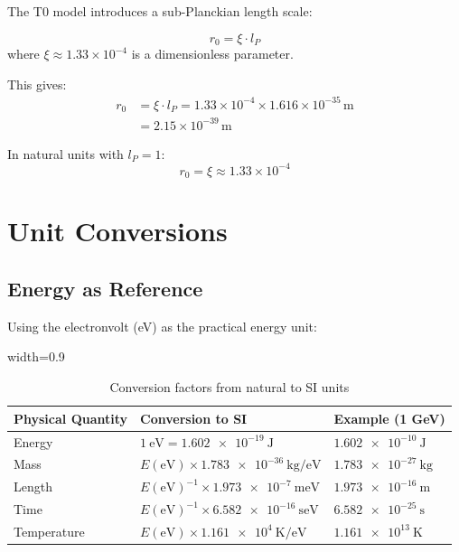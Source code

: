	The T0 model introduces a sub-Planckian length scale:
	
	\begin{definition}[T0 Length]
		\begin{equation}
			r_0 = \xi \cdot l_P
		\end{equation}
		where $\xi \approx 1.33 \times 10^{-4}$ is a dimensionless parameter.
	\end{definition}
	
	This gives:
	\begin{align}
		r_0 &= \xi \cdot l_P = 1.33 \times 10^{-4} \times 1.616 \times 10^{-35}\,\text{m} \\
		&= 2.15 \times 10^{-39}\,\text{m}
	\end{align}
	
	In natural units with $l_P = 1$:
	\begin{equation}
		r_0 = \xi \approx 1.33 \times 10^{-4}
	\end{equation}
	
	\section{Unit Conversions}
	
	\subsection{Energy as Reference}
	
	Using the electronvolt (eV) as the practical energy unit:
	
	\begin{table}[htbp]
		\centering
		\begin{adjustbox}{width=0.9\textwidth}
			\begin{tabular}{lll}
				\toprule
				\textbf{Physical Quantity} & \textbf{Conversion to SI} & \textbf{Example (1 GeV)} \\
				\midrule
				Energy & $\SI{1}{\electronvolt} = \SI{1.602e-19}{\joule}$ & $\SI{1.602e-10}{\joule}$ \\
				Mass & $E(\text{eV}) \times \SI{1.783e-36}{\kilogram\per\electronvolt}$ & $\SI{1.783e-27}{\kilogram}$ \\
				Length & $E(\text{eV})^{-1} \times \SI{1.973e-7}{\meter\electronvolt}$ & $\SI{1.973e-16}{\meter}$ \\
				Time & $E(\text{eV})^{-1} \times \SI{6.582e-16}{\second\electronvolt}$ & $\SI{6.582e-25}{\second}$ \\
				Temperature & $E(\text{eV}) \times \SI{1.161e4}{\kelvin\per\electronvolt}$ & $\SI{1.161e13}{\kelvin}$ \\
				\bottomrule
			\end{tabular}
		\end{adjustbox}
		\caption{Conversion factors from natural to SI units}
		\label{tab:conversions}
	\end{table}
	
